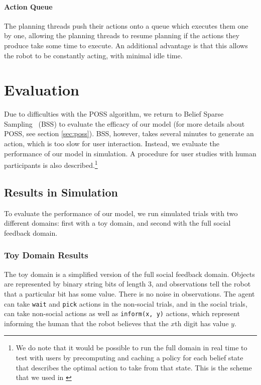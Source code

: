 \documentclass[conference]{IEEEtran}
\begin{document}
\paragraph{Action Queue} The planning threads push their actions onto a queue which executes them one by one, allowing the planning threads to resume planning if the actions they produce take some time to execute. An additional advantage is that this allows the robot to be constantly acting, with minimal idle time. 

\section{Evaluation}

Due to difficulties with the POSS algorithm, we return to Belief Sparse Sampling~\citep{bss} (BSS) to evaluate the efficacy of our model (for more details about POSS, see section \ref{sec:poss}). BSS, however, takes several minutes to generate an action, which is too slow for user interaction. Instead, we evaluate the performance of our model in simulation. A procedure for user studies with human participants is also described.\footnote{We do note that it would be possible to run the full domain in real time to test with users by precomputing and caching a policy for each belief state that describes the optimal action to take from that state. This is the scheme that we used in \cite{socialfeedback}}

\subsection{Results in Simulation}

To evaluate the performance of our model, we run simulated trials with two different domains: first with a toy domain, and second with the full social feedback domain. 
\subsubsection{Toy Domain Results}

The toy domain is a simplified version of the full social feedback domain. Objects are represented by binary string bits of length 3, and observations tell the robot that a particular bit has some value. There is no noise in observations. The agent can take \texttt{wait} and \texttt{pick} actions in the non-social trials, and in the social trials, can take non-social actions as well as \texttt{inform(x, y)} actions, which represent informing the human that the robot believes that the $x$th digit has value $y$. 
\end{document}
